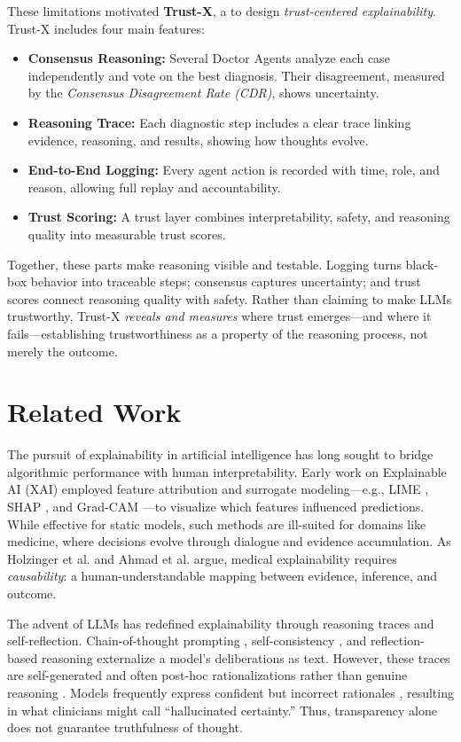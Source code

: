 \documentclass[letterpaper]{article} %
\begin{document}
These limitations motivated \textbf{Trust-X}, a to design \emph{trust-centered explainability}. 
Trust-X includes four main features:
\begin{itemize}
    \item \textbf{Consensus Reasoning:} Several Doctor Agents analyze each case independently and vote on the best diagnosis. Their disagreement, measured by the \textit{Consensus Disagreement Rate (CDR)}, shows uncertainty.
    \item \textbf{Reasoning Trace:} Each diagnostic step includes a clear trace linking evidence, reasoning, and results, showing how thoughts evolve.
    \item \textbf{End-to-End Logging:} Every agent action is recorded with time, role, and reason, allowing full replay and accountability.
    \item \textbf{Trust Scoring:} A trust layer combines interpretability, safety, and reasoning quality into measurable trust scores.
\end{itemize}
Together, these parts make reasoning visible and testable. Logging turns black-box behavior into traceable steps; consensus captures uncertainty; and trust scores connect reasoning quality with safety.
Rather than claiming to make LLMs trustworthy, Trust-X \emph{reveals and measures} where trust emerges—and where it fails—establishing trustworthiness as a property of the reasoning process, not merely the outcome.


\section{Related Work}

The pursuit of explainability in artificial intelligence has long sought to bridge algorithmic performance with human interpretability. Early work on Explainable AI (XAI) employed feature attribution and surrogate modeling—e.g., LIME \cite{ribeiro2016should}, SHAP \cite{lundberg2017unified}, and Grad-CAM \cite{selvaraju2017grad}—to visualize which features influenced predictions. While effective for static models, such methods are ill-suited for domains like medicine, where decisions evolve through dialogue and evidence accumulation. As Holzinger et al. \cite{holzinger2019causability} and Ahmad et al. \cite{ahmad2018interpretable} argue, medical explainability requires \emph{causability}: a human-understandable mapping between evidence, inference, and outcome.

The advent of LLMs has redefined explainability through reasoning traces and self-reflection. Chain-of-thought prompting \cite{wei2022chain}, self-consistency \cite{wang2022self}, and reflection-based reasoning \cite{shinn2023reflexion} externalize a model’s deliberations as text. However, these traces are self-generated and often post-hoc rationalizations rather than genuine reasoning \cite{turpin2023language}. Models frequently express confident but incorrect rationales \cite{kadavath2022language,ji2023survey}, resulting in what clinicians might call “hallucinated certainty.” Thus, transparency alone does not guarantee truthfulness of thought.
\end{document}
